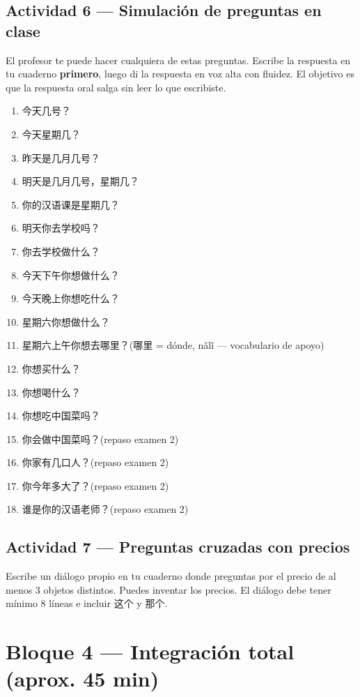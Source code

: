 \documentclass[12pt, a4paper]{article}
\begin{document}
\subsection{Actividad 6 — Simulación de preguntas en clase}

El profesor te puede hacer cualquiera de estas preguntas. Escribe la respuesta en tu cuaderno \textbf{primero}, luego di la respuesta en voz alta con fluidez. El objetivo es que la respuesta oral salga sin leer lo que escribiste.

\begin{enumerate}[leftmargin=1.5cm]
\item 今天几号？
\item 今天星期几？
\item 昨天是几月几号？
\item 明天是几月几号，星期几？
\item 你的汉语课是星期几？
\item 明天你去学校吗？
\item 你去学校做什么？
\item 今天下午你想做什么？
\item 今天晚上你想吃什么？
\item 星期六你想做什么？
\item 星期六上午你想去哪里？\quad (哪里 = dónde, nǎlǐ — vocabulario de apoyo)
\item 你想买什么？
\item 你想喝什么？
\item 你想吃中国菜吗？
\item 你会做中国菜吗？\quad (repaso examen 2)
\item 你家有几口人？\quad (repaso examen 2)
\item 你今年多大了？\quad (repaso examen 2)
\item 谁是你的汉语老师？\quad (repaso examen 2)
\end{enumerate}

\subsection{Actividad 7 — Preguntas cruzadas con precios}

Escribe un diálogo propio en tu cuaderno donde preguntas por el precio de al menos 3 objetos distintos. Puedes inventar los precios. El diálogo debe tener mínimo 8 líneas e incluir 这个 y 那个.

\section{Bloque 4 — Integración total (aprox. 45 min)}
\end{document}
